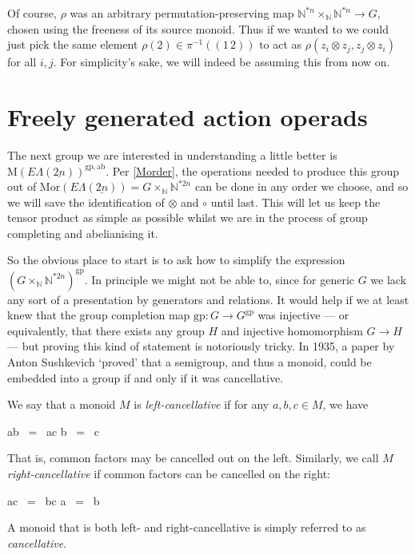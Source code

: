 \documentclass{amsbook} %
\newcommand{\ELnn}{E\Lambda(\underline{2n})}
\newenvironment{eq*}{\begin{equation*}}{\end{equation*}}
\numberwithin{section}{chapter}
\begin{document}
Of course, $\rho$ was an arbitrary permutation-preserving map $\mathbb{N}^{\ast n} \times_{\mathbb{N}} \mathbb{N}^{\ast n} \to G$, chosen using the freeness of its source monoid. Thus if we wanted to we could just pick the same element $\rho(2) \in \pi^{-1}((1 \, 2))$ to act as $\rho(z_i \otimes z_j, z_j \otimes z_i)$ for all $i, j$. For simplicity's sake, we will indeed be assuming this from now on.

\section{Freely generated action operads}

The next group we are interested in understanding a little better is $\mathrm{M}(\ELnn)^{\mathrm{gp},\mathrm{ab}}$. Per \cref{Morder}, the operations needed to produce this group out of $\mathrm{Mor}(\ELnn) = G \times_{\mathbb{N}} \mathbb{N}^{\ast 2n}$ can be done in any order we choose, and so we will save the identification of $\otimes$ and $\circ$ until last. This will let us keep the tensor product as simple as possible whilst we are in the process of group completing and abelianising it.

So the obvious place to start is to ask how to simplify the expression $(G \times_{\mathbb{N}} \mathbb{N}^{\ast 2n})^{\mathrm{gp}}$. In principle we might not be able to, since for generic $G$ we lack any sort of a presentation by generators and relations. It would help if we at least knew that the group completion map $\mathrm{gp} : G \to G^{\mathrm{gp}}$ was injective --- or equivalently, that there exists any group $H$ and injective homomorphism $G \to H$ --- but proving this kind of statement is notoriously tricky. In 1935, a paper by Anton Sushkevich `proved' that a semigroup, and thus a monoid, could be embedded into a group if and only if it was cancellative.

\begin{Defi} We say that a monoid $M$ is \emph{left-cancellative} if for any $a, b, c \in M$, we have
\begin{eq*} ab \, = \, ac \quad \implies \quad b \, = \, c \end{eq*}
That is, common factors may be cancelled out on the left. Similarly, we call $M$ \emph{right-cancellative} if common factors can be cancelled on the right:
\begin{eq*} ac \, = \, bc \quad \implies \quad a \, = \, b \end{eq*}
A monoid that is both left- and right-cancellative is simply referred to as \emph{cancellative}.
\end{Defi}
\end{document}
